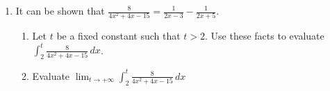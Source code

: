 \documentclass[12pt]{article}
\newif\ifans
\begin{document}
\begin{enumerate}
\begin{enumerate}
\ifans{\fbox{$4\pi$}} \fi

\end{enumerate}

\item It can be shown that $\frac{8}{4x^2+4x-15}=\frac{1}{2x-3}-\frac{1}{2x+5}$.

\begin{enumerate}

\item Let $t$ be a fixed constant such that $t>2$.  Use these facts to evaluate $\int_2^t \frac{8}{4x^2+4x-15} \,dx$.

\ifans{\fbox{$\frac{1}{2}\ln{\left|\frac{2t-3}{2t+5}\right|}+\ln{3}$}} \fi

\item Evaluate $\lim_{t \rightarrow +\infty} \int_2^t \frac{8}{4x^2+4x-15} \,dx$

\ifans{\fbox{$\ln{3}$}} \fi

\end{enumerate}

\end{enumerate}
\end{document}
